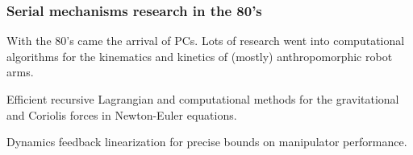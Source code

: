 \begin{frame}
	\frametitle{Serial mechanisms research in the 80's}
	\begin{tcolorbox}[toggle enlargement=none]
		With the 80's came the arrival of PCs. Lots of research went into computational algorithms for the kinematics and kinetics of (mostly) anthropomorphic robot arms.
	\end{tcolorbox}
	\begin{tcolorbox}[coltitle=magenta!70,colframe=blue!80!red,title=Active control schemes,toggle enlargement=forced]
		Efficient recursive Lagrangian and computational methods for the gravitational and Coriolis forces in Newton-Euler equations.
	\end{tcolorbox}
	\begin{tcolorbox}[coltitle=pink!70,colframe=gray!80!red,title=Feedback Linearization,toggle enlargement=evenpage]
		Dynamics feedback linearization for precise bounds on manipulator performance.
	\end{tcolorbox}
\end{frame}

